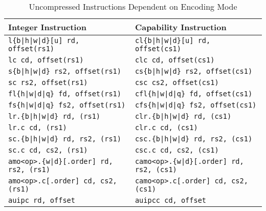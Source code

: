 {\begin{table}
\begin{center}
\begin{tabular}{ll}
\toprule
Integer Instruction		& Capability Instruction \\
\midrule
\texttt{l\{b|h|w|d\}[u] rd, offset(rs1)} & \texttt{cl\{b|h|w|d\}[u] rd, offset(cs1)} \\
\texttt{lc cd, offset(rs1)} & \texttt{clc cd, offset(cs1)} \\
\texttt{s\{b|h|w|d\} rs2, offset(rs1)} & \texttt{cs\{b|h|w|d\} rs2, offset(cs1)} \\
\texttt{sc rs2, offset(rs1)} & \texttt{csc cs2, offset(cs1)} \\
\texttt{fl\{h|w|d|q\} fd, offset(rs1)} & \texttt{cfl\{h|w|d|q\} fd, offset(cs1)} \\
\texttt{fs\{h|w|d|q\} fs2, offset(rs1)} & \texttt{cfs\{h|w|d|q\} fs2, offset(cs1)} \\
\texttt{lr.\{b|h|w|d\} rd, (rs1)} & \texttt{clr.\{b|h|w|d\} rd, (cs1)} \\
\texttt{lr.c cd, (rs1)} & \texttt{clr.c cd, (cs1)} \\
\texttt{sc.\{b|h|w|d\} rd, rs2, (rs1)} & \texttt{csc.\{b|h|w|d\} rd, rs2, (cs1)} \\
\texttt{sc.c cd, cs2, (rs1)} & \texttt{csc.c cd, cs2, (cs1)} \\
\texttt{amo<op>.\{w|d\}[.order] rd, rs2, (rs1)} & \texttt{camo<op>.\{w|d\}[.order] rd, rs2, (cs1)} \\
\texttt{amo<op>.c[.order] cd, cs2, (rs1)} & \texttt{camo<op>.c[.order] cd, cs2, (cs1)} \\
\texttt{auipc rd, offset} & \texttt{auipcc cd, offset} \\
\bottomrule
\end{tabular}
\end{center}
\caption{Uncompressed Instructions Dependent on Encoding Mode}
\label{table:riscv-capmode-instructions}
\end{table}

}
